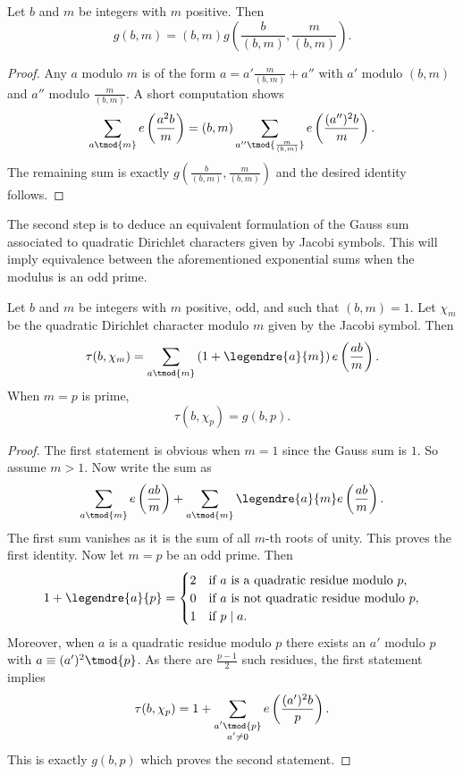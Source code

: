 \documentclass[12pt]{article}
\begin{document}
      \begin{proposition}\label{prop:quadratic_Gauss_sum_relatively_prime_reduction}
        Let \(b\) and \(m\) be integers with \(m\) positive. Then
        \[
          g(b,m) = (b,m)g\left(\frac{b}{(b,m)},\frac{m}{(b,m)}\right).
        \]
      \end{proposition}
      \begin{proof}
        Any \(a\) modulo \(m\) is of the form \(a = a'\frac{m}{(b,m)}+a''\) with \(a'\) modulo \((b,m)\) and \(a''\) modulo \(\frac{m}{(b,m)}\). A short computation shows
        \[
          \sum_{a \tmod{m}}e\left(\frac{a^{2}b}{m}\right) = (b,m)\sum_{a'' \tmod{\frac{m}{(b,m)}}}e\left(\frac{(a'')^{2}b}{m}\right).
        \]
        The remaining sum is exactly \(g\left(\frac{b}{(b,m)},\frac{m}{(b,m)}\right)\) and the desired identity follows.
      \end{proof}

      The second step is to deduce an equivalent formulation of the Gauss sum associated to quadratic Dirichlet characters given by Jacobi symbols. This will imply equivalence between the aforementioned exponential sums when the modulus is an odd prime.

      \begin{proposition}\label{prop:Gauss_sum_equivalence_for_primes}
        Let \(b\) and \(m\) be integers with \(m\) positive, odd, and such that \((b,m) = 1\). Let \(\chi_{m}\) be the quadratic Dirichlet character modulo \(m\) given by the Jacobi symbol. Then
        \[
          \tau(b,\chi_{m}) = \sum_{a \tmod{m}}\left(1+\legendre{a}{m}\right)e\left(\frac{ab}{m}\right).
        \]
        When \(m = p\) is prime,
        \[
          \tau(b,\chi_{p}) = g(b,p).
        \]
      \end{proposition}
      \begin{proof}
        The first statement is obvious when \(m = 1\) since the Gauss sum is \(1\). So assume \(m > 1\). Now write the sum as
        \[
          \sum_{a \tmod{m}}e\left(\frac{ab}{m}\right)+\sum_{a \tmod{m}}\legendre{a}{m}e\left(\frac{ab}{m}\right).
        \]
        The first sum vanishes as it is the sum of all \(m\)-th roots of unity. This proves the first identity. Now let \(m = p\) be an odd prime. Then
        \[
          1+\legendre{a}{p} = \begin{cases} 2 & \text{if \(a\) is a quadratic residue modulo \(p\)}, \\ 0 & \text{if \(a\) is not quadratic residue modulo \(p\)}, \\ 1 & \text{if \(p \mid a\)}. \end{cases}
        \]
        Moreover, when \(a\) is a quadratic residue modulo \(p\) there exists an \(a'\) modulo \(p\) with \(a \equiv (a')^{2} \tmod{p}\). As there are \(\frac{p-1}{2}\) such residues, the first statement implies
        \[
          \tau(b,\chi_{p}) = 1+\sum_{\substack{a' \tmod{p} \\ a' \neq 0}}e\left(\frac{(a')^{2}b}{p}\right).
        \]
        This is exactly \(g(b,p)\) which proves the second statement.
      \end{proof}
\end{document}
